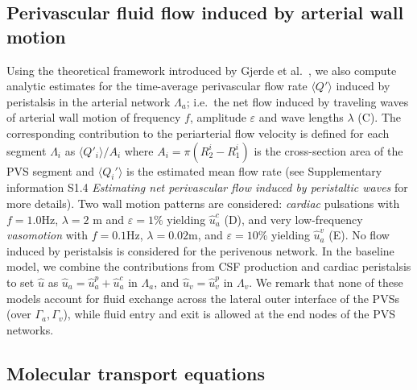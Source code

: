 \documentclass[fleqn,10pt]{wlscirep}
\begin{document}

\subsection*{Perivascular fluid flow induced by arterial wall motion}

Using the theoretical framework introduced by Gjerde et
al.~\cite{gjerde2023directional}, we also compute analytic estimates
for the time-average perivascular flow rate $\langle Q' \rangle$
induced by peristalsis in the arterial network $\Lambda_a$; i.e.~the
net flow induced by traveling waves of arterial wall motion of
frequency $f$, amplitude $\varepsilon$ and wave lengths $\lambda$
(C). The corresponding contribution to the
periarterial flow velocity is defined for each segment $\Lambda_i$ as
$\langle Q'_i \rangle/A_i$ where $A_i = \pi (R_2^i - R_1^i)$ is the
cross-section area of the PVS segment and $\langle Q_i' \rangle$ is
the estimated mean flow rate (see Supplementary information S1.4
\emph{Estimating net perivascular flow induced by peristaltic waves}
for more details). Two wall motion patterns are considered:
\emph{cardiac} pulsations with $f = 1.0$Hz, $\lambda = 2$ m and
$\varepsilon = 1\%$ yielding $\hat{u}_a^c$ (D), and
very low-frequency \emph{vasomotion} with $f = 0.1$Hz, $\lambda =
0.02$m, and $\varepsilon = 10\%$ yielding $\hat{u}_a^v$
(E). No flow induced by peristalsis is considered for
the perivenous network. In the baseline model, we combine the
contributions from CSF production and cardiac peristalsis to set
$\hat{u}$ as $\hat{u}_a = \hat{u}_a^p + \hat{u}_a^c$ in $\Lambda_a$,
and $\hat{u}_v = \hat{u}_v^p$ in $\Lambda_v$. We remark that none of
these models account for fluid exchange across the lateral outer
interface of the PVSs (over $\Gamma_a, \Gamma_v$), while fluid entry
and exit is allowed at the end nodes of the PVS networks.

\subsection*{Molecular transport equations}
\end{document}
